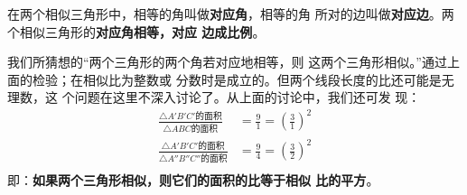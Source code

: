 在两个相似三角形中，相等的角叫做\textbf{对应角}，相等的角
所对的边叫做\textbf{对应边}。两个相似三角形的\textbf{对应角相等，对应
边成比例}。

我们所猜想的“两个三角形的两个角若对应地相等，则
这两个三角形相似。”通过上面的检验；在相似比为整数或
分数时是成立的。但两个线段长度的比还可能是无理数，这
个问题在这里不深入讨论了。从上面的讨论中，我们还可发
现：
\[\begin{split}
	\frac{\triangle A'B'C'\text{的面积} }{\triangle ABC\text{的面积}}&=\frac{9}{1}=\left(\frac{3}{1}\right)^2\\
	\frac{\triangle A'B'C'\text{的面积} }{\triangle A''B''C''\text{的面积}}&=\frac{9}{4}=\left(\frac{3}{2}\right)^2\\
\end{split}\]
即：\textbf{如果两个三角形相似，则它们的面积的比等于相似
比的平方}。













\begin{blk}
	
\end{blk}

\begin{blk}
	
\end{blk}

\begin{blk}
	
\end{blk}




\begin{example}
	
\end{example}

\begin{solution}
	
\end{solution}


\begin{example}
	
\end{example}

\begin{solution}
    
\end{solution}


\begin{example}
	
\end{example}

